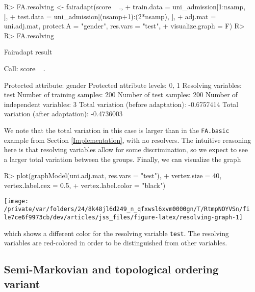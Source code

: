 \documentclass[
  notitle]{jss}
\begin{document}
\begin{CodeChunk}
\begin{CodeInput}
R> FA.resolving <- fairadapt(score ~ .,
+   train.data = uni_admission[1:nsamp, ],
+   test.data = uni_admission[(nsamp+1):(2*nsamp), ],
+   adj.mat = uni.adj.mat, protect.A = "gender", res.vars = "test",
+   visualize.graph = F)
R> 
R> FA.resolving
\end{CodeInput}
\begin{CodeOutput}
Fairadapt result

Call:
 score ~ . 

Protected attribute:                  gender 
Protected attribute levels:           0, 1 
Resolving variables:                  test 
Number of training samples:           200 
Number of test samples:               200 
Number of independent variables:      3 
Total variation (before adaptation):  -0.6757414 
Total variation (after adaptation):   -0.4736003 
\end{CodeOutput}
\end{CodeChunk}

We note that the total variation in this case is larger than in the
\texttt{FA.basic} example from Section \ref{Implementation}, with no
resolvers. The intuitive reasoning here is that resolving variables
allow for some discrimination, so we expect to see a larger total
variation between the groups. Finally, we can visualize the graph

\begin{CodeChunk}
\begin{CodeInput}
R> plot(graphModel(uni.adj.mat, res.vars = "test"),
+   vertex.size = 40, vertex.label.cex = 0.5,
+   vertex.label.color = "black")
\end{CodeInput}


\begin{center}\texttt{[image: /private/var/folders/24/8k48jl6d249\_n\_qfxwsl6xvm0000gn/T/RtmpNOYVSn/file7ce6f9973cb/dev/articles/jss\_files/figure-latex/resolving-graph-1]} \end{center}

\end{CodeChunk}

which shows a different color for the resolving variable \texttt{test}.
The resolving variables are red-colored in order to be distinguished
from other variables.

\hypertarget{semi-markovian-and-topological-ordering-variant}{%
\subsection{Semi-Markovian and topological ordering
variant}\label{semi-markovian-and-topological-ordering-variant}}
\end{document}
